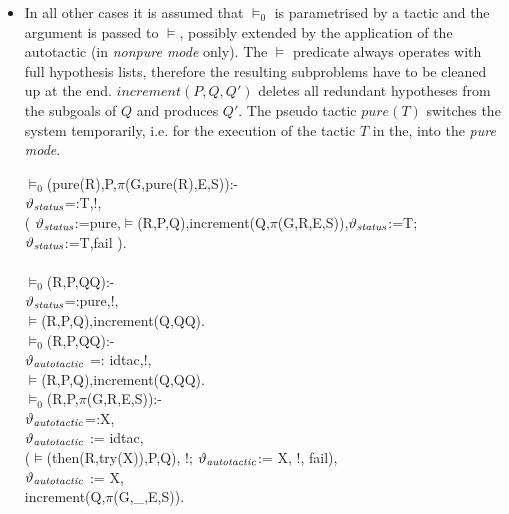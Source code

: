 \documentclass[11pt]{report}
\makeatletter
\newcommand{\inv}[1]{\index{#1}}
\newcommand{\ulinv}[1]{\index{#1@\texttt{#1}}}
\makeatother
\begin{document}
\begin{itemize}
 
 \item
 \ulinv{pure}
 In all other cases it is assumed that $\models_0$ is parametrised
 by a tactic and the argument is passed to $\models$, possibly
 extended by the application of the autotactic (in \emph{nonpure mode}
 only). The $\models$ predicate always operates with full
 hypothesis lists, therefore the resulting subproblems have
 to be cleaned up at the end. $increment(P,Q,Q')$ deletes all
 redundant hypotheses from the subgoals of $Q$ and produces $Q'$.
 The pseudo tactic $pure(T)$ switches the system temporarily,
 i.e. for the execution of the tactic $T$ in the,   
 into the \emph{pure mode}.
 \inv{$\vartheta_{\it status}$}
\begin{sf}\begin{tabbing}
$\models_{0}$(pure(R),P,$\pi$(G,pure(R),E,S)):-\\[-0.15ex]
\hspace{2em}$\vartheta_{\it status}$=:T,!,\\[-0.15ex]
\hspace{2em}( $\vartheta_{\it status}$:=pure,$\models$(R,P,Q),increment(Q,$\pi$(G,R,E,S)),$\vartheta_{\it status}$:=T; \\[-0.15ex]
\hspace{3em}$\vartheta_{\it status}$:=T,fail ).\\[-0.7ex]
\\[-0.15ex]
$\models_{0}$(R,P,QQ):-\\[-0.15ex]
\hspace{2em}$\vartheta_{\it status}$=:pure,!,\\[-0.15ex]
\hspace{2em}$\models$(R,P,Q),increment(Q,QQ).\\[-0.15ex]
$\models_{0}$(R,P,QQ):-\\[-0.15ex]
\hspace{2em}$\vartheta_{\it autotactic}$ =: idtac,!,\\[-0.15ex]
\hspace{2em}$\models$(R,P,Q),increment(Q,QQ).\\[-0.15ex]
$\models_{0}$(R,P,$\pi$(G,R,E,S)):-\\[-0.15ex]
\hspace{2em}$\vartheta_{\it autotactic}$=:X,\\[-0.15ex]
\hspace{2em}$\vartheta_{\it autotactic}$ := idtac,\\[-0.15ex]
\hspace{2em}($\models$(then(R,try(X)),P,Q), !; $\vartheta_{\it autotactic}$:= X, !, fail),\\[-0.15ex]
\hspace{2em}$\vartheta_{\it autotactic}$ := X,\\[-0.15ex]
\hspace{2em}increment(Q,$\pi$(G,\_\hspace{0.1em},E,S)).\\[-0.7ex]


\end{tabbing}
\end{sf}
\end{itemize}
\end{document}
